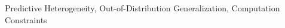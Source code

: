 \documentclass[twoside,11pt]{article}
\begin{document}
\begin{keywords}
  Predictive Heterogeneity, Out-of-Distribution Generalization, Computation Constraints
\end{keywords}














\newpage


%
%
\appendix


\vskip 0.2in

\end{document}
